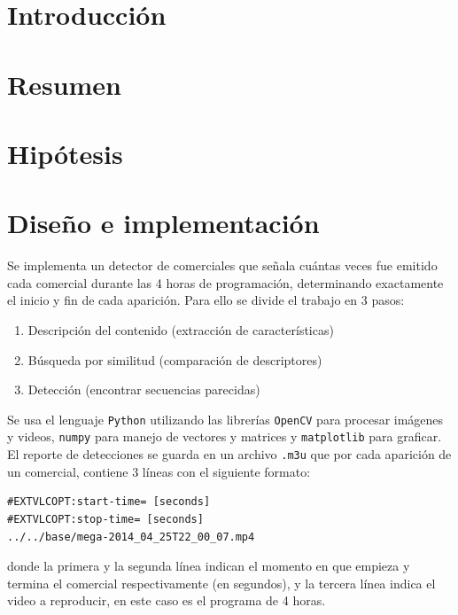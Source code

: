 \documentclass[14pt,letterpaper,hidelinks]{extarticle}
\begin{document}

\renewcommand{\sectionmark}[1]{\markright{\thesection.\ #1}}
\renewcommand{\headrulewidth}{0.5pt}

%
\tableofcontents
\listoffigures
\listoftables

\newpage
\section{Introducción}
\section{Resumen}
\section{Hipótesis}
\section{Diseño e implementación}
Se implementa un detector de comerciales que señala cuántas veces fue emitido cada comercial durante las 4 horas de programación, determinando exactamente el inicio y
fin de cada aparición. Para ello se divide el trabajo en 3 pasos: 
\begin{enumerate}
\item Descripción del contenido (extracción de características)
\item Búsqueda por similitud (comparación de descriptores)
\item Detección (encontrar secuencias parecidas)
\end{enumerate}

Se usa el lenguaje \verb+Python+ utilizando las librerías \verb+OpenCV+ para procesar imágenes y videos, \verb+numpy+ para manejo de vectores y matrices y \verb+matplotlib+ para graficar.\\

El reporte de detecciones se guarda en un archivo \verb+.m3u+ que por cada aparición de un comercial, contiene 3 líneas con el siguiente formato: 
\begin{verbatim}
#EXTVLCOPT:start-time= [seconds]
#EXTVLCOPT:stop-time= [seconds]
../../base/mega-2014_04_25T22_00_07.mp4
\end{verbatim}
donde la primera y la segunda línea indican el momento en que empieza y termina el comercial respectivamente (en segundos), y la tercera línea indica el video a reproducir, en este caso es el programa de 4 horas.\\
\end{document}

